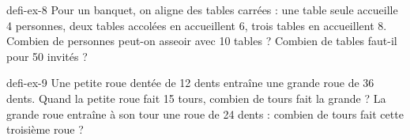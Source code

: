 \begin{blocEdition}{defi-ex-8}
Pour un banquet, on aligne des tables carrées : une table seule accueille 4 personnes, deux tables accolées en accueillent 6, trois tables en accueillent 8. Combien de personnes peut-on asseoir avec 10 tables ? Combien de tables faut-il pour 50 invités ?\par{}\par\par{}\par{}\par{}\par{}\par{}\par{}
\end{blocEdition}
\begin{blocEdition}{defi-ex-9}
Une petite roue dentée de 12 dents entraîne une grande roue de 36 dents. Quand la petite roue fait 15 tours, combien de tours fait la grande ? La grande roue entraîne à son tour une roue de 24 dents : combien de tours fait cette troisième roue ?\par{}\par\par{}\par{}\par{}\par{}\par{}\par{}
\end{blocEdition}
